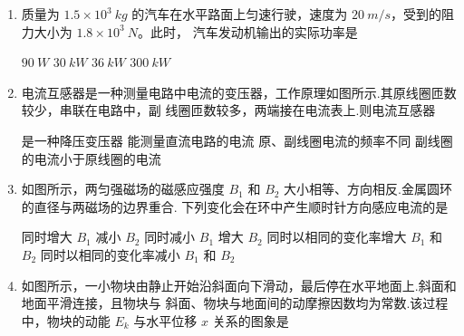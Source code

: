 
\gaokaoxz
\begin{enumerate}



\item
质量为 $ 1.5 \times 10^{3} \ kg $ 的汽车在水平路面上匀速行驶，速度为 $ 20 \ m/s $，受到的阻力大小为 $ 1.8 \times 10^3 \ N $。此时，
汽车发动机输出的实际功率是  

\fourchoices
{$ 90 \ W $}
{$ 30 \ kW $}
{$ 36 \ kW $}
{$ 300 \ kW $}




\item
电流互感器是一种测量电路中电流的变压器，工作原理如图所示.其原线圈匝数较少，串联在电路中，副
线圈匝数较多，两端接在电流表上.则电流互感器  
\begin{figure}[h!]
\centering

\end{figure}


\fourchoices
{是一种降压变压器}
{能测量直流电路的电流}
{原、副线圈电流的频率不同}
{副线圈的电流小于原线圈的电流}




\item
如图所示，两匀强磁场的磁感应强度 $ B_{1} $ 和 $ B_{2} $ 大小相等、方向相反.金属圆环的直径与两磁场的边界重合.
下列变化会在环中产生顺时针方向感应电流的是  
\begin{figure}[h!]
\centering

\end{figure}


\fourchoices
{同时增大 $ B_{1} $ 减小 $ B_{2} $}
{同时减小 $ B_{1} $ 增大 $ B_{2} $}
{同时以相同的变化率增大 $ B_{1} $ 和 $ B_{2} $}
{同时以相同的变化率减小 $ B_{1} $ 和 $ B_{2} $}




\item
如图所示，一小物块由静止开始沿斜面向下滑动，最后停在水平地面上.斜面和地面平滑连接，且物块与
斜面、物块与地面间的动摩擦因数均为常数.该过程中，物块的动能 $ E_{k} $ 与水平位移 $ x $ 关系的图象是  
\begin{figure}[h!]
\centering

\end{figure}

\pfourchoices
{}
{}
{}
{}








\end{enumerate}

